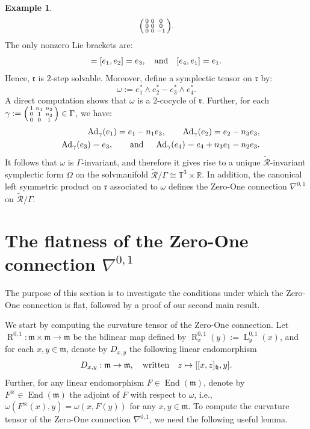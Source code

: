 \documentclass[preprint,12pt,1p]{elsarticle}
\theoremstyle{plain}
\theoremstyle{definition}
\newtheorem{example}[theorem]{Example}
\newcommand{\rel}{\mathbb{R}}
\newcommand{\n}{\nabla}
\newcommand{\nc}{\n^{0,1}}
\newcommand{\w}{\omega}
\newcommand{\et}{\quad \textnormal{and}\quad}
\newcommand{\End}{\operatorname{End}}
\newcommand{\h}{\mathfrak{h}}
\newcommand{\m}{\mathfrak{m}}
\newcommand{\Ad}{\operatorname{Ad}}
\newcommand{\la}{\operatorname{L}^{0,1}}
\newcommand{\ra}{\operatorname{R}^{0,1}}
\numberwithin{equation}{section}
\begin{document}
\begin{example}
\begin{equation*}
\begin{psmallmatrix}
0&0&0\\0&0&0\\0&0&-1\\\end{psmallmatrix}.
\end{equation*}
The only nonzero Lie brackets are:
\begin{equation*}
[e_4,e_3]=[e_1,e_2]=e_3,\et [e_4,e_1]=e_1.
\end{equation*}
Hence, $\mathfrak{r}$ is $2$-step solvable. Moreover, define a symplectic tensor on $\mathfrak{r}$ by:
\begin{equation*}
\w:=e^*_1\wedge e^*_2-e^*_3\wedge e^*_4.
\end{equation*}
A direct computation shows that $\w$ is a $2$-cocycle of $\mathfrak{r}$. Further, for each $\gamma:=\begin{psmallmatrix}
1&n_1&n_2\\0&1&n_3\\0&0&1\\
\end{psmallmatrix}\in\Gamma$, we have:
\begin{eqnarray*}
&&\Ad_\gamma(e_1)=e_1-n_1e_3,\qquad\Ad_\gamma(e_2)=e_2-n_3e_3,\\
&&\Ad_\gamma(e_3)=e_3,\quad\et\,\,\Ad_\gamma(e_4)=e_4+n_3e_1-n_2e_3.
\end{eqnarray*}
It follows that $\w$ is $\Gamma$-invariant, and therefore it gives rise to a unique $\widetilde{\mathcal{R}}$-invariant symplectic form $\Omega$ on the solvmanifold $\widetilde{\mathcal{R}}/\Gamma\cong\mathbb{T}^3\times\rel$. In addition, the canonical left symmetric product on $\mathfrak{r}$ associated to $\omega$ defines the Zero-One connection $\nc$ on $\widetilde{\mathcal{R}}/\Gamma$.
\end{example}

\section{The flatness of the Zero-One connection $\nc$}
The purpose of this section is to investigate the conditions under which the Zero-One connection is flat, followed by a proof of our second main result.

We start by computing the curvature tensor of the Zero-One connection. Let $\ra:\mathfrak{m}\times\m\to\mathfrak{m}$ be the bilinear map defined by $\ra_x(y):=\la_y(x)$, and for each $x,y\in\mathfrak{m}$, denote by $D_{x,y}$ the following linear endomorphism
\begin{equation}\label{DxyDef}
D_{x,y}:\mathfrak{m}\to\mathfrak{m},\quad\textnormal{written}\quad z\mapsto[[x,z]_\h,y].
\end{equation}
Further, for any linear endomorphism $F\in\End(\mathfrak{m})$, denote by $F^\divideontimes\in\End(\mathfrak{m})$ the adjoint of $F$ with respect to $\omega$, i.e., $
\omega(F^\divideontimes(x),y)=\omega(x,F(y))$ for any $x,y\in\m$. To compute the curvature tensor of the Zero-One connection $\nc$, we need the following useful lemma. 
\end{document}
